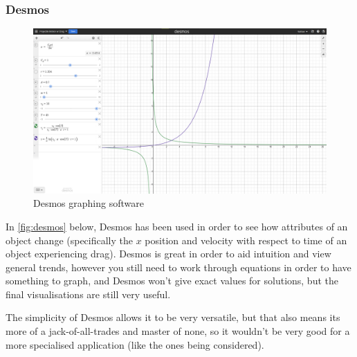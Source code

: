 \documentclass[11pt]{article}
\begin{document}
            \subsubsection{Desmos}
                \begin{figure}[!ht]
                    \begin{center}
                        \includegraphics[width=.5\textwidth]{figures/desmos.png}
                    \end{center}
                    \caption{Desmos graphing software}
                    \label{fig:desmos}
                \end{figure}

                In \autoref{fig:desmos} below, Desmos has been used in order to see how attributes of an object change (specifically the $x$ position and velocity with respect to time of an object experiencing drag). Desmos is great in order to aid intuition and view general trends, however you still need to work through equations in order to have something to graph, and Desmos won't give exact values for solutions, but the final visualisations are still very useful. 

                The simplicity of Desmos allows it to be very versatile, but that also means its more of a jack-of-all-trades and master of none, so it wouldn't be very good for a more specialised application (like the ones being considered).
\end{document}

